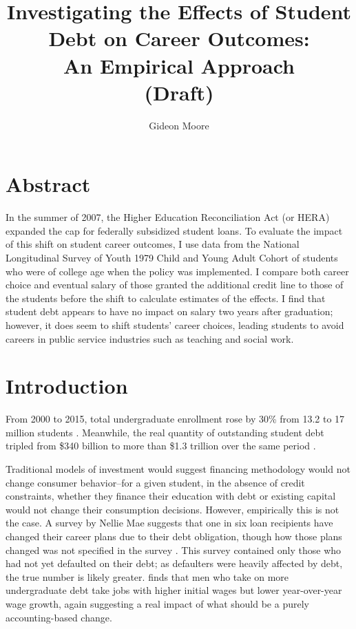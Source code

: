 \documentclass[12pt]{article}
\title{Investigating the Effects of Student Debt on Career Outcomes:\\ An Empirical Approach\\(Draft)}
\author{Gideon Moore}
\begin{document}
	{ \maketitle}
	
	
	\section*{Abstract}
	
	In the summer of 2007, the Higher Education Reconciliation Act (or HERA) expanded the cap for federally subsidized student loans. To evaluate the impact of this shift on student career outcomes, I use data from the National Longitudinal Survey of Youth 1979 Child and Young Adult Cohort of students who were of college age when the policy was implemented. I compare both career choice and eventual salary of those granted the additional credit line to those of the students before the shift to calculate estimates of the effects. I find that student debt appears to have no impact on salary two years after graduation; however, it does seem to shift students' career choices, leading students to avoid careers in public service industries such as teaching and social work.
	
	\pagebreak
	
	\section{Introduction}
	
	From 2000 to 2015, total undergraduate enrollment rose by 30\% from 13.2 to 17 million students \parencite{mcfarland2017}. Meanwhile, the real quantity of outstanding student debt tripled from \$340 billion to more than \$1.3 trillion over the same period \parencite{feiveson2018}.
	
	Traditional models of investment would suggest financing methodology would not change consumer behavior--for a given student, in the absence of credit constraints, whether they finance their education with debt or existing capital would not change their consumption decisions. However, empirically this is not the case. A survey by Nellie Mae suggests that one in six loan recipients have changed their career plans due to their debt obligation, though how those plans changed was not specified in the survey \parencite{baum2003}. This survey contained only those who had not yet defaulted on their debt; as defaulters were heavily affected by debt, the true number is likely greater. \textcite{minicozzi2005} finds that men who take on more undergraduate debt take jobs with higher initial wages but lower year-over-year wage growth, again suggesting a real impact of what should be a purely accounting-based change. 
	
\end{document}
